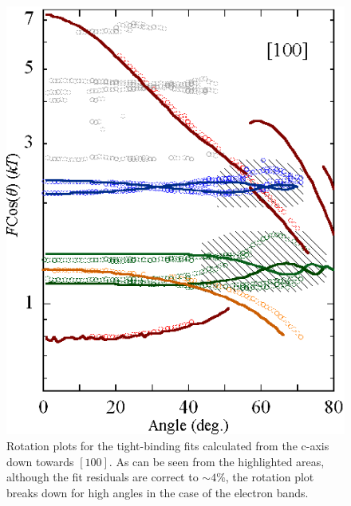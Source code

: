 \begin{figure}[htbp]
    \begin{center}
        \includegraphics[scale=0.9]{Chapter-dHvABaFe2P2/Figures/AngleDepMeasurements/TightBindingFits/TightBindingFits}
        \caption{Rotation plots for the tight-binding fits calculated from the c-axis down towards $[100]$. As can be seen from the highlighted areas, although the fit residuals are correct to $\sim4\%$, the rotation plot breaks down for high angles in the case of the electron bands.}
        \label{Fig:ResD:TightBindingFitRotationPlot}
    \end{center}
\end{figure}

